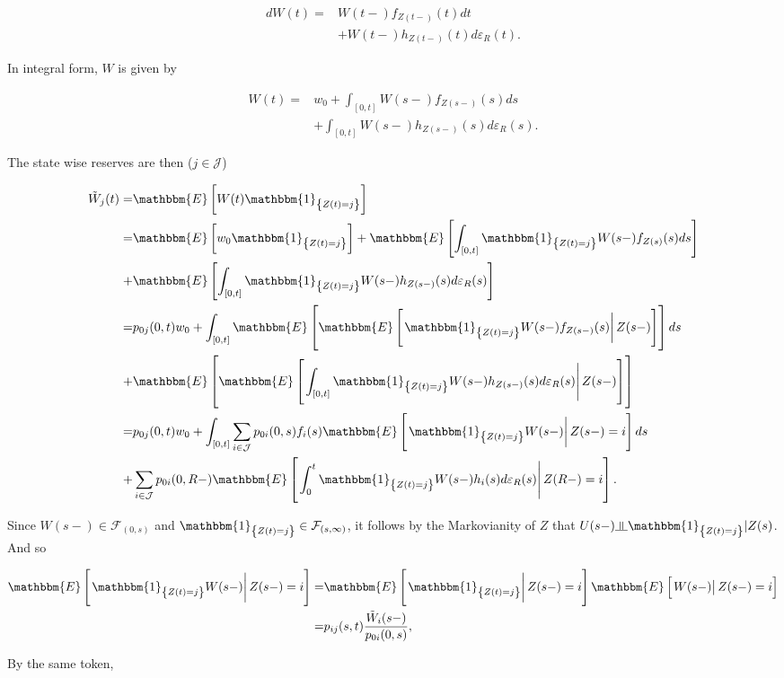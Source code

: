 \documentclass{book}
\newcommand{\indep}{\rotatebox[origin=c]{90}{$\models$}}
\newcommand{\1}[1]{\mathbbm{1}_{\left\lbrace #1 \right\rbrace}}
\newcommand{\expec}[1][def]{\mathbbm{E} \left[ #1 \right]}
\newcommand{\econd}[2][def]{\mathbbm{E} \left[ \left. #1 \right| #2 \right]}
\theoremstyle{break}
\theoremstyle{remark}
\numberwithin{equation}{section}
\begin{document}
\begin{align*}
	dW(t) =& W(t-) f_{Z(t-)}(t) dt \\
	&+ W(t-) h_{Z(t-)}(t) d \varepsilon_{R}(t).
\end{align*}

In integral form, $W$ is given by

\begin{align*}
	W(t) =& w_0 + \int_{\left[ 0,t \right]} W(s-) f_{Z(s-)}(s) ds \\
	&+ \int_{\left[ 0,t \right]} W(s-) h_{Z(s-)}(s) d \varepsilon_{R}(s).
\end{align*}

The state wise reserves are then ($j \in \mathcal{J}$)

\begin{align} \label{SkalBruges}
	\tilde{W}_j(t) =& \expec[W(t) \1{Z(t)=j}] \nonumber \\
	=& \expec[w_0 \1{Z(t)=j}] + \expec[\int_{\left[ 0,t \right]} \1{Z(t)=j} W(s-) f_{Z(s)}(s) ds] \nonumber \\
	+& \expec[\int_{\left[ 0,t \right]} \1{Z(t)=j} W(s-) h_{Z(s-)}(s) d \varepsilon_{R}(s)] \nonumber \\
	=& p_{0j}(0,t) w_0 + \int_{\left[ 0,t \right]} \mathbbm{E} \left[ \econd[\1{Z(t)=j} W(s-) f_{Z(s-)}(s)]{Z(s-)} \right]ds \nonumber \\
	+& \mathbbm{E} \left[ \econd[ \int_{\left[ 0,t \right]} \1{Z(t)=j} W(s-) h_{Z(s-)}(s) d \varepsilon_{R}(s) ]{Z(s-)} \right] \nonumber \\
	=& p_{0j}(0,t) w_0 + \int_{\left[ 0,t \right]} \sum_{i \in \mathcal{J}} p_{0i}(0,s) f_{i}(s) \econd[\1{Z(t)=j} W(s-)]{Z(s-)=i} ds \\
	+& \sum_{i \in \mathcal{J}} p_{0i}(0,R-) \econd[\int_0^t \1{Z(t)=j} W(s-) h_{i}(s) d \varepsilon_{R}(s)]{Z(R-)=i}. \nonumber
\end{align}

Since $W(s-) \in  \mathcal{F}_{\left( 0,s \right)}$ and $\1{Z(t)=j} \in \mathcal{F}_{\left( s,\infty \right)}$, it follows by the Markovianity of $Z$ that $U(s-) \indep \1{Z(t)=j} | Z(s)$. And so 

\begin{align*}
	\econd[\1{Z(t)=j}W(s-)]{Z(s-)=i} =& \econd[\1{Z(t)=j}]{Z(s-)=i} \econd[W(s-)]{Z(s-)=i} \\
	=& p_{ij}(s,t) \frac{\tilde{W}_i(s-)}{p_{0i}(0,s)},
\end{align*}

By the same token,
\end{document}
